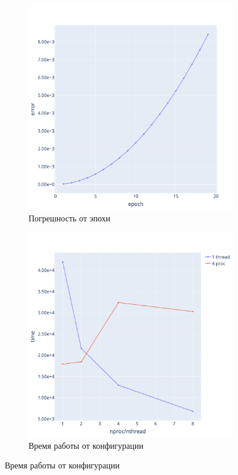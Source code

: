 \documentclass[a4paper,hidelinks,12pt]{article}
\begin{document}
\begin{figure}[H]
\begin{subfigure}{.5\textwidth}
  \centering
  \includegraphics[width=\linewidth]{pictures/L1_256_errs.png}
  \caption{Погрешность от эпохи}
\end{subfigure}%
\begin{subfigure}{.5\textwidth}
  \centering
  \includegraphics[width=\linewidth]{pictures/L1_256_perf.png}
  \caption{Время работы от конфигурации}
\end{subfigure}%
\end{figure}
\end{document}
